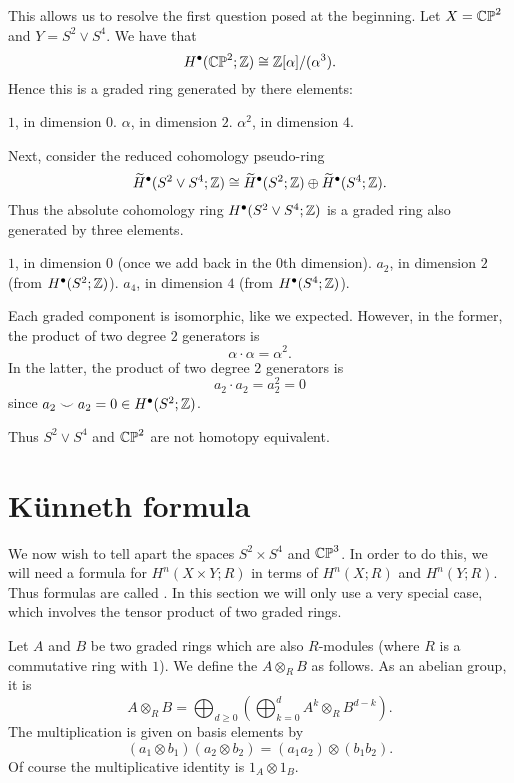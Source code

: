 This allows us to resolve the first question posed at the beginning.
Let $X = \mathbb{CP}^2$ and $Y = S^2 \vee S^4$.
We have that
\[ H^\bullet(\mathbb{CP}^2; \mathbb Z) \cong \mathbb Z[\alpha] / (\alpha^3). \]
Hence this is a graded ring generated by there elements:
\begin{itemize}
	\ii $1$, in dimension $0$.
	\ii $\alpha$, in dimension $2$.
	\ii $\alpha^2$, in dimension $4$.
\end{itemize}
Next, consider the reduced cohomology pseudo-ring
\[ \widetilde H^\bullet(S^2 \vee S^4; \mathbb Z) \cong
	\widetilde H^\bullet(S^2; \mathbb Z)
	\oplus \widetilde H^\bullet(S^4 ; \mathbb Z).
\]
Thus the absolute cohomology ring $H^\bullet(S^2 \vee S^4 ; \mathbb Z)$
is a graded ring also generated by three elements.
\begin{itemize}
	\ii $1$, in dimension $0$ (once we add back in the $0$th dimension).
	\ii $a_2$, in dimension $2$ (from $H^\bullet(S^2 ; \mathbb Z)$).
	\ii $a_4$, in dimension $4$ (from $H^\bullet(S^4 ; \mathbb Z)$).
\end{itemize}
Each graded component is isomorphic, like we expected.
However, in the former, the product of two degree $2$ generators is
\[ \alpha \cdot \alpha = \alpha^2. \]
In the latter, the product of two degree $2$ generators is
\[ a_2 \cdot a_2 = a_2^2 = 0 \]
since $a_2 \smile a_2 = 0 \in H^\bullet(S^2; \mathbb Z)$.

Thus $S^2 \vee S^4$ and $\mathbb{CP}^2$ are not homotopy equivalent.

\section{K\"unneth formula}
We now wish to tell apart the spaces $S^2 \times S^4$ and $\mathbb{CP}^3$.
In order to do this, we will need a formula
for $H^n(X \times Y; R)$ in terms of $H^n(X;R)$ and $H^n(Y;R)$.
Thus formulas are called .
In this section we will only use a very special case,
which involves the tensor product of two graded rings.

\begin{definition}
	Let $A$ and $B$ be two graded rings which are also $R$-modules
	(where $R$ is a commutative ring with $1$).
	We define the  $A \otimes_R B$ as follows.
	As an abelian group, it is 
	\[ A \otimes_R B = \bigoplus_{d \ge 0}
		\left( \bigoplus_{k=0}^{d} A^k \otimes_R B^{d-k}  \right). \]
	The multiplication is given on basis elements by
	\[ \left( a_1 \otimes b_1 \right)\left( a_2 \otimes b_2 \right)
		= (a_1a_2) \otimes (b_1b_2).
	\]
	Of course the multiplicative identity is $1_A \otimes 1_B$.
\end{definition}

